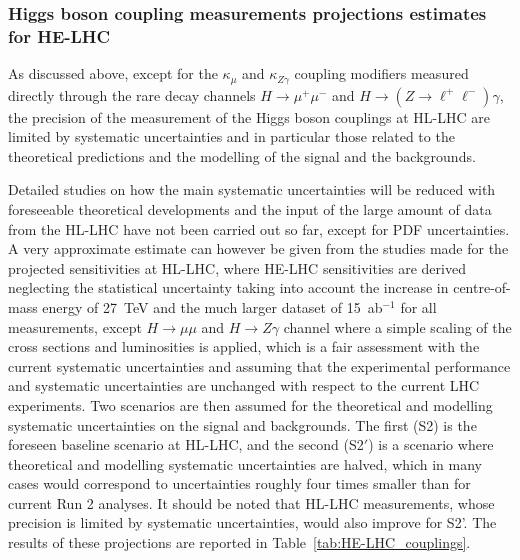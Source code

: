 \subsubsection{Higgs boson coupling measurements projections estimates for HE-LHC}
\label{sec2:HE-LHC_couplings} 

As discussed above, except for the $\kappa_{\mu}$ and
$\kappa_{Z\gamma}$ coupling modifiers measured directly through the
rare decay channels $H\rightarrow \mu^+\mu^-$ and $H\rightarrow (Z
\rightarrow \ell^+\ell^-)\gamma$, the precision of the measurement of
the Higgs boson couplings at HL-LHC are limited by systematic
uncertainties and in particular those related to the theoretical
predictions and the modelling of the signal and the backgrounds.

Detailed studies on how the main systematic uncertainties will be
reduced with foreseeable theoretical developments and the input of the
large amount of data from the HL-LHC have not been carried out so far,
except for PDF uncertainties. A very approximate estimate can however
be given from the studies made for the projected sensitivities at
HL-LHC, where HE-LHC sensitivities are derived neglecting the
statistical uncertainty taking into account the increase in
centre-of-mass energy of 27~TeV and the much larger dataset of
15~ab$^{-1}$ for all measurements, except $H \rightarrow \mu\mu$ and $H \rightarrow Z\gamma$ channel where a simple scaling of the cross sections and luminosities is applied, which is a fair assessment with the current systematic uncertainties and assuming that the experimental performance and
systematic uncertainties are unchanged with respect to the current LHC
experiments. Two scenarios are then assumed for the theoretical and
modelling systematic uncertainties on the signal and backgrounds. The
first (S2) is the foreseen baseline scenario at HL-LHC, and the second (S2$'$) is a scenario where theoretical and modelling systematic
uncertainties are halved, which in many cases would  correspond to uncertainties roughly four times smaller than for current Run 2 analyses. It should be noted that HL-LHC measurements, whose precision is limited by systematic uncertainties, would also improve for S2'. The results of these projections are
reported in Table~\ref{tab:HE-LHC_couplings}. 

